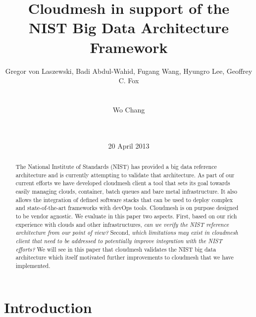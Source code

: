 

\newcommand{\TODO}[1]{\todo[inline,color=red!20]{#1}}

\title{Cloudmesh in support of the\\NIST Big Data Architecture Framework}


\author{
\alignauthor
Gregor von Laszewski, Badi Abdul-Wahid, Fugang Wang, Hyungro Lee, Geoffrey C. Fox\\
       \\
       \\
\alignauthor
Wo Chang\\
       \\
       \\
}
\date{20 April 2013}

\maketitle

\listoftodos[Notes]

\begin{abstract}

  The National Institute of Standards (NIST) has provided a big data
  reference architecture and is currently attempting to validate that
  architecture. As part of our current efforts we have developed
  cloudmesh client a tool that sets its goal towards easily managing
  clouds, container, batch queues and bare metal infrastructure. It
  also allows the integration of defined software stacks that can be
  used to deploy complex and state-of-the-art frameworks with devOps
  tools. Cloudmesh is on purpose designed to be vendor agnostic. We
  evaluate in this paper two aspects. First, based on our rich
  experience with clouds and other infrastructures, {\it can we verify the
  NIST reference architecture from our point of view?} Second, {\it which
  limitations may exist in cloudmesh client that need to be addressed
  to potentially improve integration with the NIST efforts?}  We will
  see in this paper that cloudmesh validates the NIST big data
  architecture which itself motivated further improvements to
  cloudmesh that we have implemented.
\end{abstract}


\section{Introduction}

